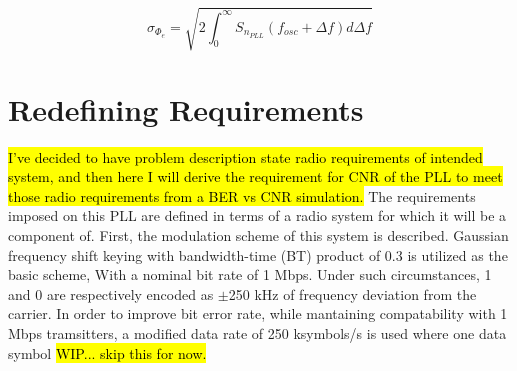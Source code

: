 		\begin{equation}\label{eq:rpm}
			\sigma_{\Phi_e} = \sqrt{2\int_0^\infty S_{n_{PLL}}(f_{osc} + \Delta f)d\Delta f}
		\end{equation}



\pagebreak
\section{Redefining Requirements}
\hl{I've decided to have problem description state radio requirements of intended system, and then here I will derive the requirement for CNR of the PLL to meet those radio requirements from a BER vs CNR simulation. }
The requirements imposed on this PLL are defined in terms of a radio system for which it will be a component of. First, the modulation scheme of this system is described. Gaussian frequency shift keying with bandwidth-time (BT) product of 0.3 is utilized as the basic scheme, With a nominal bit rate of 1 Mbps. Under such circumstances, 1 and 0 are respectively encoded as $\pm$250 kHz of frequency deviation from the carrier. In order to improve bit error rate, while mantaining compatability with 1 Mbps tramsitters, a modified data rate of 250 ksymbols/s is used where one data symbol \hl{WIP... skip this for now.}